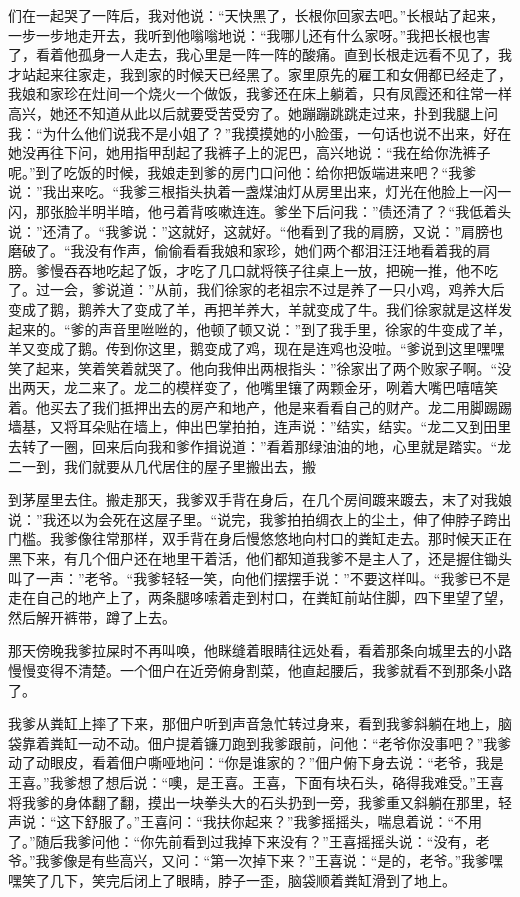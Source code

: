 \documentclass[12pt,UTF8]{ctexbook}
\begin{document}
们在一起哭了一阵后，我对他说：“天快黑了，长根你回家去吧。”长根站了起来，一步一步地走开去，我听到他嗡嗡地说：“我哪儿还有什么家呀。”我把长根也害了，看着他孤身一人走去，我心里是一阵一阵的酸痛。直到长根走远看不见了，我才站起来往家走，我到家的时候天已经黑了。家里原先的雇工和女佣都已经走了，我娘和家珍在灶间一个烧火一个做饭，我爹还在床上躺着，只有凤霞还和往常一样高兴，她还不知道从此以后就要受苦受穷了。她蹦蹦跳跳走过来，扑到我腿上问我：“为什么他们说我不是小姐了？”我摸摸她的小脸蛋，一句话也说不出来，好在她没再往下问，她用指甲刮起了我裤子上的泥巴，高兴地说：“我在给你洗裤子呢。”到了吃饭的时候，我娘走到爹的房门口问他：给你把饭端进来吧？“我爹说：”我出来吃。“我爹三根指头执着一盏煤油灯从房里出来，灯光在他脸上一闪一闪，那张脸半明半暗，他弓着背咳嗽连连。爹坐下后问我：”债还清了？“我低着头说：”还清了。“我爹说：”这就好，这就好。“他看到了我的肩膀，又说：”肩膀也磨破了。“我没有作声，偷偷看看我娘和家珍，她们两个都泪汪汪地看着我的肩膀。爹慢吞吞地吃起了饭，才吃了几口就将筷子往桌上一放，把碗一推，他不吃了。过一会，爹说道：”从前，我们徐家的老祖宗不过是养了一只小鸡，鸡养大后变成了鹅，鹅养大了变成了羊，再把羊养大，羊就变成了牛。我们徐家就是这样发起来的。“爹的声音里咝咝的，他顿了顿又说：”到了我手里，徐家的牛变成了羊，羊又变成了鹅。传到你这里，鹅变成了鸡，现在是连鸡也没啦。“爹说到这里嘿嘿笑了起来，笑着笑着就哭了。他向我伸出两根指头：”徐家出了两个败家子啊。“没出两天，龙二来了。龙二的模样变了，他嘴里镶了两颗金牙，咧着大嘴巴嘻嘻笑着。他买去了我们抵押出去的房产和地产，他是来看看自己的财产。龙二用脚踢踢墙基，又将耳朵贴在墙上，伸出巴掌拍拍，连声说：”结实，结实。“龙二又到田里去转了一圈，回来后向我和爹作揖说道：”看着那绿油油的地，心里就是踏实。“龙二一到，我们就要从几代居住的屋子里搬出去，搬


到茅屋里去住。搬走那天，我爹双手背在身后，在几个房间踱来踱去，末了对我娘说：”我还以为会死在这屋子里。“说完，我爹拍拍绸衣上的尘土，伸了伸脖子跨出门槛。我爹像往常那样，双手背在身后慢悠悠地向村口的粪缸走去。那时候天正在黑下来，有几个佃户还在地里干着活，他们都知道我爹不是主人了，还是握住锄头叫了一声：”老爷。“我爹轻轻一笑，向他们摆摆手说：”不要这样叫。“我爹已不是走在自己的地产上了，两条腿哆嗦着走到村口，在粪缸前站住脚，四下里望了望，然后解开裤带，蹲了上去。

那天傍晚我爹拉屎时不再叫唤，他眯缝着眼睛往远处看，看着那条向城里去的小路慢慢变得不清楚。一个佃户在近旁俯身割菜，他直起腰后，我爹就看不到那条小路了。

我爹从粪缸上摔了下来，那佃户听到声音急忙转过身来，看到我爹斜躺在地上，脑袋靠着粪缸一动不动。佃户提着镰刀跑到我爹跟前，问他：“老爷你没事吧？”我爹动了动眼皮，看着佃户嘶哑地问：“你是谁家的？”佃户俯下身去说：“老爷，我是王喜。”我爹想了想后说：“噢，是王喜。王喜，下面有块石头，硌得我难受。”王喜将我爹的身体翻了翻，摸出一块拳头大的石头扔到一旁，我爹重又斜躺在那里，轻声说：“这下舒服了。”王喜问：“我扶你起来？”我爹摇摇头，喘息着说：“不用了。”随后我爹问他：“你先前看到过我掉下来没有？”王喜摇摇头说：“没有，老爷。”我爹像是有些高兴，又问：“第一次掉下来？”王喜说：“是的，老爷。”我爹嘿嘿笑了几下，笑完后闭上了眼睛，脖子一歪，脑袋顺着粪缸滑到了地上。
\end{document}
